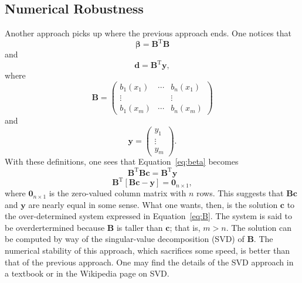 \documentclass[twocolumn]{article}
\begin{document}
\subsection{Numerical Robustness}

Another approach picks up where the previous approach ends. One notices that
\begin{equation}
   \boldsymbol{\beta} = \mathbf{B}^{\text{T}} \mathbf{B}
\end{equation}
and
\begin{equation}
   \mathbf{d} = \mathbf{B}^{\text{T}} \mathbf{y},
\end{equation}
where
\begin{equation}
   \mathbf{B} =
   \begin{pmatrix}
      b_1(x_1) & \cdots & b_n(x_1)\\
      \vdots   &        & \vdots\\
      b_1(x_m) & \cdots & b_n(x_m)
   \end{pmatrix}
\end{equation}
and
\begin{equation}
   \mathbf{y} =
   \begin{pmatrix}
      y_1\\
      \vdots\\
      y_m
   \end{pmatrix}.
\end{equation}
With these definitions, one sees that Equation~\ref{eq:beta} becomes
\begin{equation}
   \mathbf{B}^{\text{T}} \mathbf{B} \mathbf{c} = \mathbf{B}^{\text{T}}
   \mathbf{y}
\end{equation}
\begin{equation}
   \mathbf{B}^{\text{T}} [\mathbf{B} \mathbf{c} - \mathbf{y}] =
   \mathbf{0}_{n \times 1},
   \label{eq:B}
\end{equation}
where $\mathbf{0}_{n \times 1}$ is the zero-valued column matrix with $n$ rows.
This suggests that $\mathbf{B} \mathbf{c}$ and $\mathbf{y}$ are nearly equal in
some sense.  What one wants, then, is the solution $\mathbf{c}$ to the
over-determined system expressed in Equation~\ref{eq:B}. The system is said to
be overdertermined because $\mathbf{B}$ is taller than $\mathbf{c}$; that is,
$m > n$. The solution can be computed by way of the singular-value
decomposition (SVD) of $\mathbf{B}$. The numerical stability of this approach,
which sacrifices some speed, is better than that of the previous approach. One
may find the details of the SVD approach in a textbook or in the Wikipedia page
on SVD.
\end{document}
